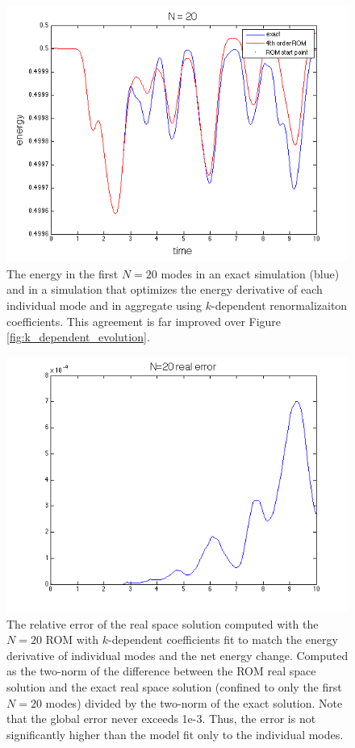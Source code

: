 \documentclass{article}
\begin{document}
\begin{figure}[h]
\includegraphics[width=\textwidth]{both_energy_evolution.png}
\caption{The energy in the first $N=20$ modes in an exact simulation (blue) and in a simulation that optimizes the energy derivative of each individual mode and in aggregate using $k$-dependent renormalizaiton coefficients. This agreement is far improved over Figure \ref{fig:k_dependent_evolution}.}\label{fig:both_evolution}
\end{figure}

\begin{figure}[h]
\includegraphics[width=\textwidth]{both_real_space.png}
\caption{The relative error of the real space solution computed with the $N=20$ ROM with $k$-dependent coefficients fit to match the energy derivative of individual modes and the net energy change. Computed as the two-norm of the difference between the ROM real space solution and the exact real space solution (confined to only the first $N=20$ modes) divided by the two-norm of the exact solution. Note that the global error never exceeds 1e-3. Thus, the error is not significantly higher than the model fit only to the individual modes.}\label{fig:both_real_space}
\end{figure}
\end{document}
